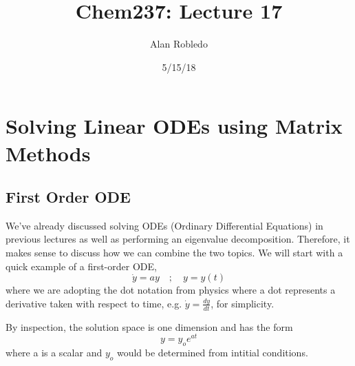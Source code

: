 \documentclass{article}
\title{Chem237: Lecture 17}
\date{5/15/18}
\author{Alan Robledo}
\newcommand{\be}{\begin{equation}}
\newcommand{\ee}{\end{equation}}
\begin{document}
\maketitle
\section*{Solving Linear ODEs using Matrix Methods}
\subsection{First Order ODE}
We've already discussed solving ODEs (Ordinary Differential Equations) in previous lectures as well as performing an eigenvalue decomposition.
Therefore, it makes sense to discuss how we can combine the two topics.
We will start with a quick example of a first-order ODE,
\be
  \dot{y} = a y \quad ; \quad y = y(t)
\ee
where we are adopting the dot notation from physics where a dot represents a derivative taken with respect to time, e.g. $\dot{y} = \frac{dy}{dt}$, for simplicity.

By inspection, the solution space is one dimension and has the form
\be
  y = y_o e^{a t}
\ee
where a is a scalar and $y_o$ would be determined from intitial conditions.
\end{document}
